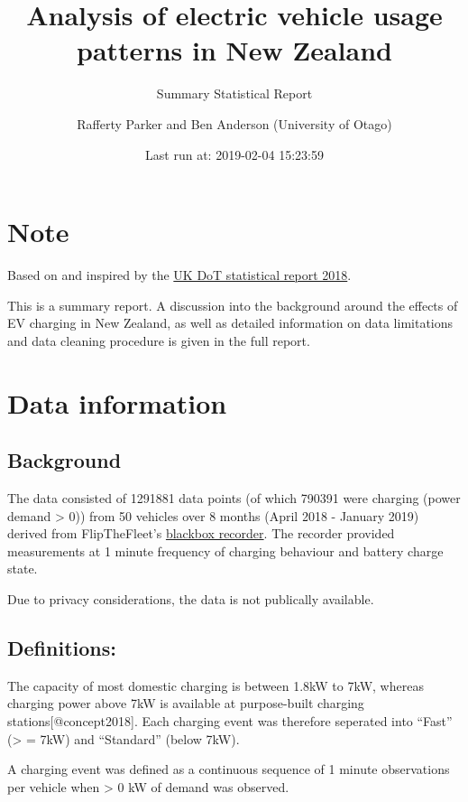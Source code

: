 \documentclass[]{article}
\title{Analysis of electric vehicle usage patterns in New Zealand}
\subtitle{Summary Statistical Report}
\author{Rafferty Parker and Ben Anderson (University of Otago)}
\date{Last run at: 2019-02-04 15:23:59}
\begin{document}
\maketitle

{
\setcounter{tocdepth}{2}
\tableofcontents
}
\section{Note}\label{note}

Based on and inspired by the
\href{https://assets.publishing.service.gov.uk/government/uploads/system/uploads/attachment_data/file/764270/electric-chargepoint-analysis-2017-domestics.pdf}{UK
DoT statistical report 2018}.

This is a summary report. A discussion into the background around the
effects of EV charging in New Zealand, as well as detailed information
on data limitations and data cleaning procedure is given in the full
report.

\section{Data information}\label{data}

\subsection{Background}\label{background}

The data consisted of 1291881 data points (of which 790391 were charging
(power demand \textgreater{} 0)) from 50 vehicles over 8 months (April
2018 - January 2019) derived from FlipTheFleet's
\href{https://flipthefleet.org/ev-black-box/}{blackbox recorder}. The
recorder provided measurements at 1 minute frequency of charging
behaviour and battery charge state.

Due to privacy considerations, the data is not publically available.

\subsection{Definitions:}\label{definitions}

The capacity of most domestic charging is between 1.8kW to 7kW, whereas
charging power above 7kW is available at purpose-built charging
stations{[}@concept2018{]}. Each charging event was therefore seperated
into ``Fast'' (\textgreater{} = 7kW) and ``Standard'' (below 7kW).

A charging event was defined as a continuous sequence of 1 minute
observations per vehicle when \textgreater{} 0 kW of demand was
observed.
\end{document}
